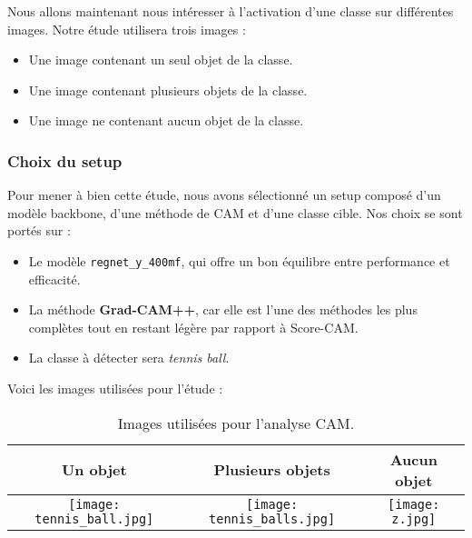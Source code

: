 Nous allons maintenant nous intéresser à l'activation d'une classe sur différentes images. Notre étude utilisera trois images : 
\begin{itemize}
    \item Une image contenant un seul objet de la classe.
    \item Une image contenant plusieurs objets de la classe.
    \item Une image ne contenant aucun objet de la classe.
\end{itemize}

\subsubsection{Choix du setup}

Pour mener à bien cette étude, nous avons sélectionné un setup composé d'un modèle backbone, d'une méthode de CAM et d'une classe cible. Nos choix se sont portés sur : 
\begin{itemize}
    \item Le modèle \texttt{regnet\_y\_400mf}, qui offre un bon équilibre entre performance et efficacité.
    \item La méthode \textbf{Grad-CAM++}, car elle est l'une des méthodes les plus complètes tout en restant légère par rapport à Score-CAM.
    \item La classe à détecter sera \textit{tennis ball}.
\end{itemize}

\newpage

Voici les images utilisées pour l'étude :

\begin{table}[H]
    \centering
    \begin{tabular}{|c|c|c|}
      \hline
      \textbf{Un objet} & \textbf{Plusieurs objets} & \textbf{Aucun objet} \\
      \hline
      \texttt{[image: tennis\_ball.jpg]} &
      \texttt{[image: tennis\_balls.jpg]} &
      \texttt{[image: z.jpg]} \\
      \hline
    \end{tabular}
    \caption{Images utilisées pour l'analyse CAM.}
    \label{tab:images_cam}
\end{table}

